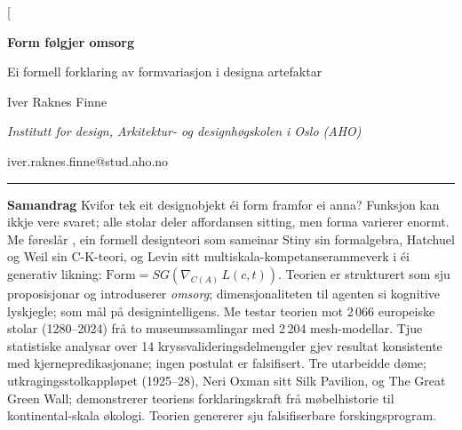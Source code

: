 


\addto\captionsenglish{%
  \renewcommand{\figurename}{Figur}%
  \renewcommand{\tablename}{Tabell}%
}
\renewcommand{\figurename}{Figur}
\renewcommand{\tablename}{Tabell}



\twocolumn[{%
\begin{@twocolumnfalse}

\vspace*{4mm}

{\raggedright
{\fontsize{22}{26}\selectfont\bfseries Form f\o lgjer omsorg\par}
\vspace{4pt}
{\Large Ei formell forklaring av formvariasjon i designa artefaktar\par}

\vspace{14pt}

{\normalsize Iver Raknes Finne\par}
\vspace{3pt}
{\small\itshape Institutt for design, Arkitektur- og designhøgskolen i Oslo (AHO)\par}
\vspace{1pt}
{\small iver.raknes.finne@stud.aho.no\par}
\par}

\vspace{14pt}

\begin{minipage}{0.96\textwidth}
\noindent\rule{\textwidth}{0.4pt}
\vspace{5pt}

{\small
\noindent\textbf{Samandrag}\quad
Kvifor tek eit designobjekt éi form framfor ei anna? Funksjon kan ikkje vere svaret; alle stolar deler affordansen sitting, men forma varierer enormt. Me føreslår \formlaere{}, ein formell designteori som sameinar Stiny sin formalgebra, Hatchuel og Weil sin C-K-teori, og Levin sitt multiskala-kompetanserammeverk i éi generativ likning: $\mathrm{Form} = SG(\nabla_{C(A)}\, L(c,t))$. Teorien er strukturert som sju proposisjonar og introduserer \textit{omsorg}; dimensjonaliteten til agenten si kognitive lyskjegle; som mål på designintelligens. Me testar teorien mot 2\,066 europeiske stolar (1280--2024) frå to museumssamlingar med 2\,204 mesh-modellar. Tjue statistiske analysar over 14 kryssvalideringsdelmengder gjev resultat konsistente med kjernepredikasjonane; ingen postulat er falsifisert. Tre utarbeidde døme; utkragingsstolkappløpet (1925--28), Neri Oxman sitt Silk Pavilion, og The Great Green Wall; demonstrerer teoriens forklaringskraft frå møbelhistorie til kontinental-skala økologi. Teorien genererer sju falsifiserbare forskingsprogram.

}
\end{minipage}
\end{@twocolumnfalse}}

